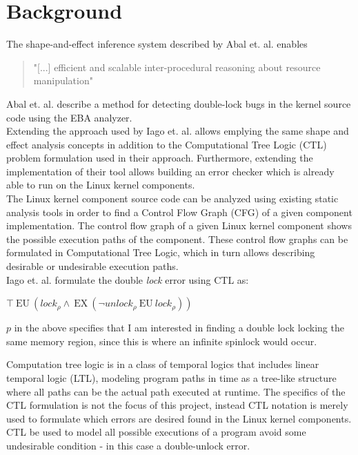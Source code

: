 \section{Background}


The shape-and-effect inference system described by Abal et. al. \cite{Abal2017EffectiveBF} enables \begin{quote}
    "[...] efficient and scalable inter-procedural reasoning about resource manipulation"
\end{quote}
 
\noindent Abal et. al. describe a method for detecting double-lock bugs in the kernel source code using the EBA analyzer. \\

\noindent Extending the approach used by Iago et. al. allows emplying the same shape and effect analysis concepts in addition to the Computational Tree Logic (CTL) problem formulation used in their approach. Furthermore, extending the implementation of their tool allows building an error checker which is already able to run on the Linux kernel components. \\

\noindent The Linux kernel component source code can be analyzed using existing static analysis tools in order to find a Control Flow Graph (CFG) of a given component implementation. The control flow graph of a given Linux kernel component shows the possible execution paths of the component. These control flow graphs can be formulated in Computational Tree Logic, which in turn allows describing desirable or undesirable execution paths.  \\

\noindent Iago et. al. formulate the double \textit{lock} error using CTL as: 

\begin{center}
    $\top\:\mathrm{EU}\:\left({l o c k}_{\rho} \wedge\:\mathrm{EX}\:\left(\neg {u n l o c k}_{\rho}\:\mathrm{EU}\:{l o c k}_{\rho}\right)\right)$
\end{center}

\noindent $p$ in the above specifies that I am interested in finding a double lock locking the same memory region, since this is where an infinite spinlock would occur. 

\noindent Computation tree logic is in a class of temporal logics that includes linear temporal logic (LTL), modeling program paths in time as a tree-like structure where all paths can be the actual path executed at runtime. The specifics of the CTL formulation is not the focus of this project, instead CTL notation is merely used to formulate which errors are desired found in the Linux kernel components. CTL be used to model all possible executions of a program avoid some undesirable condition - in this case a double-unlock error. \\

